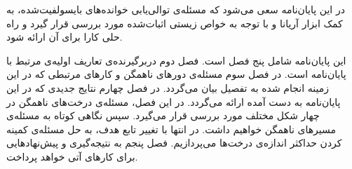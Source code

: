 
در این پایان‌نامه سعی می‌شود که مسئله‌ی توالی‌یابی خوانده‌های بایسولفیت‌شده، به کمک ابزار آریانا و با توجه به خواص زیستی اثبات‌شده مورد بررسی قرار گیرد و راه حلی کارا برای آن ارائه شود.


این پایان‌نامه شامل پنج فصل است. 
فصل دوم دربرگیرنده‌ی تعاریف اولیه‌ی مرتبط با پایان‌نامه است. 
در فصل سوم مسئله‌ی دورهای ناهمگن و کارهای مرتبطی که در این زمینه انجام شده به تفصیل بیان می‌گردد. 
در فصل چهارم نتایج جدیدی که در این پایان‌نامه به دست آمده ارائه می‌گردد. در این فصل، مسئله‌ی درخت‌های ناهمگن در چهار شکل مختلف مورد بررسی قرار می‌گیرد. سپس نگاهی کوتاه به مسئله‌ی مسیرهای ناهمگن خواهیم داشت. در انتها با تغییر تابع هدف، به حل مسئله‌ی کمینه کردن حداکثر اندازه‌ی درخت‌ها می‌پردازیم.
فصل پنجم به نتیجه‌گیری و پیش‌نهادهایی برای کارهای آتی خواهد پرداخت.
